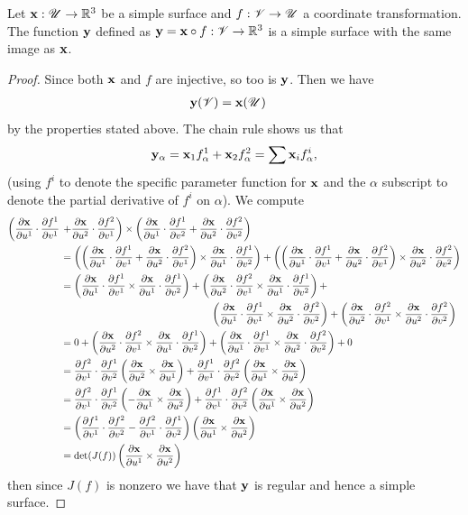   \begin{lem}
    Let $\mathbf{x}: \mathscr{U} \to \mathbb{R}^3$ be a simple surface and $f:\mathscr{V} \to \mathscr{U}$ a coordinate transformation. The function $\mathbf{y}$ defined as $\mathbf{y} = \mathbf{x} \circ f: \mathscr{V} \to \mathbb{R}^3$ is a simple surface with the same image as $\mathbf{x}$.
  \end{lem}
  \newcommand{\xdf}[2]{\frac{\del\bx}{\del u^{#1}}\cdot\frac{\del f^{#1}}{\del v^{#2}}}
  \newcommand{\df}[2]{\frac{\del f^{#1}}{\del v^{#2}}}
  \newcommand{\dx}[1]{\frac{\del\bx}{\del u^{#1}}}
  \begin{proof}
    Since both $\mathbf{x}$ and $f$ are injective, so too is $\mathbf{y}$. Then we have
    \begin{align*}
      \mathbf{y}(\mathscr{V}) &= \mathbf{x}(\mathscr{U})
    \end{align*}
    by the properties stated above. The chain rule shows us that
    \begin{equation*}
      \mathbf{y}_\alpha = \mathbf{x}_1f^1_\alpha + \mathbf{x}_2f^2_\alpha = \sum \mathbf{x}_if^i_\alpha,
    \end{equation*}
    (using $f^i$ to denote the specific parameter function for $\mathbf{x}$ and the $\alpha$ subscript to denote the partial derivative of $f^i$ on $\alpha$). We compute
    \begin{align*}
      \left(\xdf{1}{1} \right.&\left.+ \xdf{2}{1}\right) \times \left(\xdf{1}{2} + \xdf{2}{2}\right)\\
      &= \left(\left(\xdf{1}{1} + \xdf{2}{1}\right) \times \xdf{1}{2}\right) + \left(\left(\xdf{1}{1} + \xdf{2}{1}\right) \times \xdf{2}{2}\right)\\
      &=\left(\xdf{1}{1} \times \xdf{1}{2}\right) + \left(\xdf{2}{1} \times \xdf{1}{2}\right) + \\
      &\quad\quad\quad\quad\quad\quad\quad\quad\quad\quad\quad\quad\quad\quad\quad\left(\xdf{1}{1} \times \xdf{2}{2}\right) + \left(\xdf{2}{1} \times \xdf{2}{2}\right)\\
      &=0 + \left(\xdf{2}{1} \times \xdf{1}{2}\right) + \left(\xdf{1}{1} \times \xdf{2}{2}\right) + 0\\
      &=\df{2}{1}\cdot\df{1}{2}\left(\dx{2} \times \dx{1}\right) + \df{1}{1}\cdot\df{2}{2}\left(\dx{1} \times \dx{2}\right)\\
      &=\df{2}{1}\cdot\df{1}{2}\left(-\dx{1} \times \dx{2}\right) + \df{1}{1}\cdot\df{2}{2}\left(\dx{1} \times \dx{2}\right)\\
      &=\left(\df{1}{1}\cdot\df{2}{2} - \df{2}{1}\cdot\df{1}{2}\right)\left(\dx{1} \times \dx{2}\right)\\
      &=\text{det}(J(f))\left(\dx{1} \times \dx{2}\right)
    \end{align*}
    then since $J(f)$ is nonzero we have that $\mathbf{y}$ is regular and hence a simple surface.
  \end{proof}

